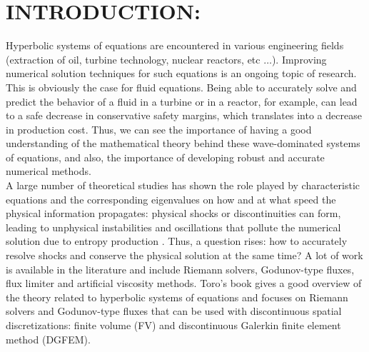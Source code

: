 %
%
%


\pagestyle{plain} %
\setcounter{page}{1}

\chapter{\uppercase {Introduction:}}
Hyperbolic systems of equations are encountered in various engineering fields (extraction of oil, turbine technology, nuclear reactors, etc $\dots$). Improving numerical solution techniques for such equations is an ongoing topic of research. This is obviously the case for fluid equations. Being able to accurately solve and predict the behavior of a fluid in a turbine or in a reactor, for example, can lead to a safe decrease in conservative safety margins, which translates into a decrease in production cost. Thus, we can see the importance of having a good understanding of the mathematical theory behind these wave-dominated systems of equations, and also, the importance of developing robust and accurate numerical methods.\\
A large number of theoretical studies has shown the role played by characteristic equations and the corresponding eigenvalues on how and at what speed the physical information propagates: physical shocks or discontinuities can form, leading to unphysical instabilities and oscillations that pollute the numerical solution due to entropy production \cite{Toro}. Thus, a question rises: how to accurately resolve shocks and conserve the physical solution at the same time? A lot of work is available in the literature and include Riemann solvers, Godunov-type fluxes, flux limiter and artificial viscosity methods. Toro's book \cite{Toro} gives a good overview of the theory related to hyperbolic systems of equations and focuses on Riemann solvers and Godunov-type fluxes that can be used with discontinuous spatial discretizations: finite volume (FV) and discontinuous Galerkin finite element method (DGFEM).
